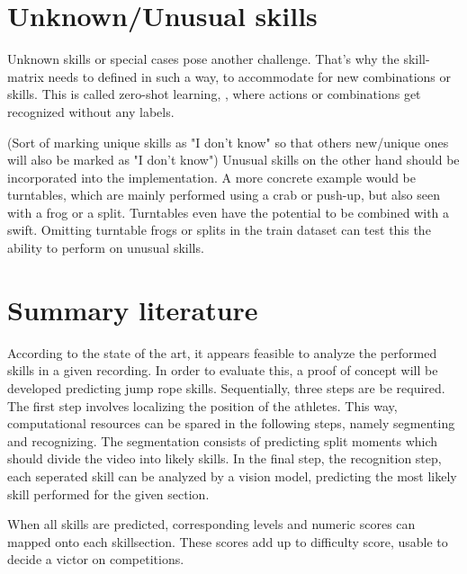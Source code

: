 \section{Unknown/Unusual skills}
\label{lit:unknown-unusual-skills}

Unknown skills or special cases pose another challenge. That's why the skill-matrix needs to defined in such a way, to accommodate for new combinations or skills. This is called zero-shot learning, \autocite{Pourpanah_2022}, where actions or combinations get recognized without any labels.

(Sort of marking unique skills as "I don't know" so that others new/unique ones will also be marked as "I don't know") Unusual skills on the other hand should be incorporated into the implementation.
A more concrete example would be turntables, which are mainly performed using a crab or push-up, but also seen with a frog or a split.
Turntables even have the potential to be combined with a swift. Omitting turntable frogs or splits in the train dataset can test this the ability to perform on unusual skills.




\section{Summary literature}
\label{lit:-summary-literature}

According to the state of the art, it appears feasible to analyze the performed skills in a given recording. In order to evaluate this, a proof of concept will be developed predicting jump rope skills. Sequentially, three steps are be required. The first step involves localizing the position of the athletes. This way, computational resources can be spared in the following steps, namely segmenting and recognizing. The segmentation consists of predicting split moments which should divide the video into likely skills. In the final step, the recognition step, each seperated skill can be analyzed by a vision model, predicting the most likely skill performed for the given section.

When all skills are predicted, corresponding levels and numeric scores can mapped onto each skillsection. These scores add up to difficulty score, usable to decide a victor on competitions.